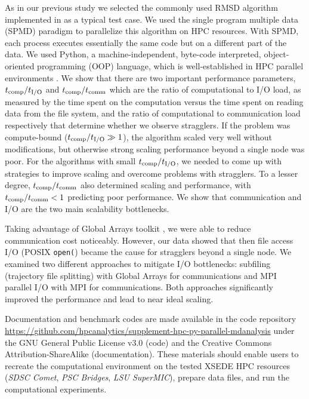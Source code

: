 As in our previous study we selected the commonly used RMSD algorithm implemented in  as a typical test case.
We used the single program multiple data (SPMD) paradigm to parallelize this algorithm on HPC resources.
With SPMD, each process executes essentially the same code but on a different part of the data. 
We used Python, a machine-independent, byte-code interpreted, object-oriented programming (OOP) language, which is well-established in HPC parallel environments \cite{GAiN}. 
We show that there are two important performance parameters, ${t}_{\text{comp}}/{t}_{\text{I/O}}$ and ${t}_{\text{comp}}/t_{\text{comm}}$ which are the ratio of computational to I/O load, as measured by the time spent on the computation versus the time spent on reading data from the file system, and the ratio of computational to communication load respectively that determine whether we observe stragglers.
If the problem was compute-bound (${t}_{\text{comp}}/{t}_{\text{I/O}} \gg 1$), the algorithm scaled very well without modifications, but otherwise strong scaling performance beyond a single node was poor.  
For the algorithms with small ${t}_{\text{comp}}/{t}_{\text{I/O}}$, we needed to come up with strategies to improve scaling and overcome problems with stragglers.
To a lesser degree, ${t}_{\text{comp}}/t_{\text{comm}}$ also determined scaling and performance, with ${t}_{\text{comp}}/t_{\text{comm}} < 1$ predicting poor performance.
We show that communication and I/O are the two main scalability bottlenecks.

Taking advantage of Global Arrays toolkit \cite{GA, GAiN}, we were able to reduce communication cost noticeably.
However, our data showed that then file access I/O (POSIX \texttt{open(}) became the cause for stragglers beyond a single node.
We examined two different approaches to mitigate I/O bottlenecks: subfiling (trajectory file splitting) with Global Arrays for communications and MPI parallel I/O with MPI for communications.
Both approaches significantly improved the performance and lead to near ideal scaling.

Documentation and benchmark codes are made available in the code repository \url{https://github.com/hpcanalytics/supplement-hpc-py-parallel-mdanalysis} under the GNU General Public License v3.0 (code) and the Creative Commons Attribution-ShareAlike (documentation). 
These materials should enable users to recreate the computational environment on the tested XSEDE HPC resources (\emph{SDSC Comet}, \emph{PSC Bridges}, \emph{LSU SuperMIC}), prepare data files, and run the computational experiments.